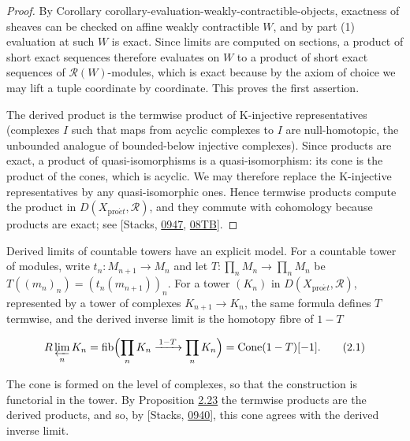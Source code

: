 \documentclass[11pt]{article}
\providecommand{\Cone}{}\renewcommand{\Cone}{\operatorname{Cone}}
\providecommand{\fib}{}\renewcommand{\fib}{\operatorname{fib}}
\begin{document}
\begin{proof}[{Proof}]\label{bp69}%
By Corollary corollary-evaluation-weakly-contractible-objects, exactness of sheaves can be checked on affine weakly contractible \(W\), and by part (1) evaluation at such \(W\) is exact. Since limits are computed on sections, a product of short exact sequences therefore evaluates on \(W\) to a product of short exact sequences of \(\mathcal R(W)\)-modules, which is exact because by the axiom of choice we may lift a tuple coordinate by coordinate. This proves the first assertion.

The derived product is the termwise product of K-injective representatives (complexes \(I\) such that maps from acyclic complexes to \(I\) are null-homotopic, the unbounded analogue of bounded-below injective complexes). Since products are exact, a product of quasi-isomorphisms is a quasi-isomorphism: its cone is the product of the cones, which is acyclic. We may therefore replace the K-injective representatives by any quasi-isomorphic ones. Hence termwise products compute the product in \(D(X_{\mathrm{pro}\acute{e}t},\mathcal R)\), and they commute with cohomology because products are exact; see [Stacks, \href{https://stacks.math.columbia.edu/tag/0947}{0947}, \href{https://stacks.math.columbia.edu/tag/08TB}{08TB}].
\end{proof}

\label{bp70}%
Derived limits of countable towers have an explicit model. For a countable tower of modules, write \(t_n:M_{n+1}\to M_n\) and let \(T:\prod_nM_n\to\prod_nM_n\) be \(T((m_n)_n)=(t_n(m_{n+1}))_n\). For a tower \((K_n)\) in \(D(X_{\mathrm{pro}\acute{e}t},\mathcal R)\), represented by a tower of complexes \(K_{n+1}\to K_n\), the same formula defines \(T\) termwise, and the derived inverse limit is the homotopy fibre of \(1-T\)

\[
R\varprojlim_n K_n
=
\fib\Bigl(
\prod_n K_n\xrightarrow{\,1-T\,}\prod_n K_n
\Bigr)=\Cone(1-T)[-1].
\tag{2.1}
\]

The cone is formed on the level of complexes, so that the construction is functorial in the tower. By Proposition \hyperref[bp68]{2.23} the termwise products are the derived products, and so, by [Stacks, \href{https://stacks.math.columbia.edu/tag/0940}{0940}], this cone agrees with the derived inverse limit.
\end{document}
